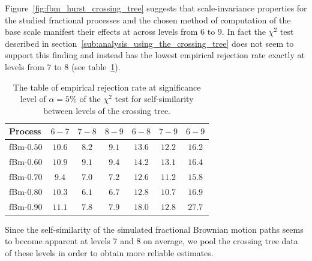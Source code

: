 \documentclass[a4paper]{article}
\begin{document}
Figure~\ref{fig:fbm_hurst_crossing_tree} suggests that scale-invariance properties
for the studied fractional processes and the chosen method of computation of the
base scale manifest their effects at across levels from 6 to 9. In fact the $\chi^2$
test described in section~\ref{sub:analysis_using_the_crossing_tree} does not seem
to support this finding and instead has the lowest empirical rejection rate exactly
at levels from 7 to 8 (see table~\ref{tbl:chi_sq_test_for_fbm_only}).
\begin{table}[h]\begin{center}
	\begin{tabular}{l||c|c|c|c|c|c|}
	Process 		&  $6-7$ &          $7-8$ & $8-9$ &  $6-8$ &  $7-9$ &  $6-9$ \\ \hline\hline
	fBm-$0.50$ 		& $10.6$ & $\mathbf{8.2}$ & $9.1$ & $13.6$ & $12.2$ & $16.2$ \\ \hline 
	fBm-$0.60$ 		& $10.9$ & $\mathbf{9.1}$ & $9.4$ & $14.2$ & $13.1$ & $16.4$ \\ \hline 
	fBm-$0.70$ 		&  $9.4$ & $\mathbf{7.0}$ & $7.2$ & $12.6$ & $11.2$ & $15.8$ \\ \hline 
	fBm-$0.80$ 		& $10.3$ & $\mathbf{6.1}$ & $6.7$ & $12.8$ & $10.7$ & $16.9$ \\ \hline 
	fBm-$0.90$ 		& $11.1$ & $\mathbf{7.8}$ & $7.9$ & $18.0$ & $12.8$ & $27.7$ \\ \hline 
 	\end{tabular}
	\caption{The table of empirical rejection rate at significance level of $\alpha = 5\%$
	of the $\chi^2$ test for self-similarity between levels of the crossing tree. }
\label{tbl:chi_sq_test_for_fbm_only}
\end{center}\end{table}
Since the self-similarity of the simulated fractional Brownian motion paths seems
to become apparent at levels 7 and 8 on average, we pool the crossing tree data of
these levels in order to obtain more reliable estimates.
\end{document}
